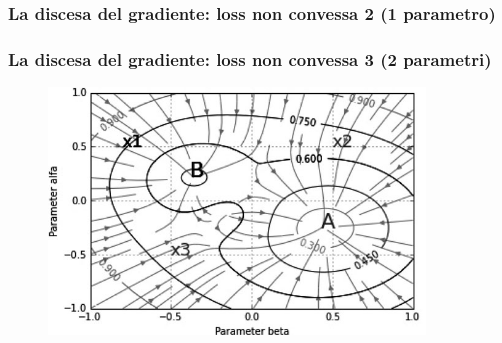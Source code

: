 \begin{frame}

	\frametitle{La discesa del gradiente: loss non convessa 2 (1 parametro)}
		\centering

\end{frame}



\begin{frame}

	\frametitle{La discesa del gradiente: loss non convessa 3 (2 parametri)}

		\begin{figure}[!htbp]
			\centering
			\includegraphics[width=10cm]{images/supervised/training_reducing_loss/non_convex_2.jpg}
		\end{figure}


\end{frame}
